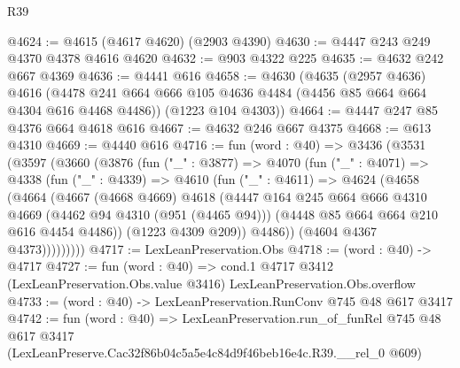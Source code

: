 \begin{lexlean}{R39}
\begin{coremodule}
@4624 := @4615 (@4617 @4620) (@2903 @4390)
@4630 := @4447 @243 @249 @4370 @4378 @4616 @4620
@4632 := @903 @4322 @225
@4635 := @4632 @242 @667 @4369
@4636 := @4441 @616
@4658 := @4630
    (@4635
      (@2957 @4636)
      @4616
      (@4478 @241 @664 @666 @105 @4636 @4484 (@4456 @85 @664 @664 @4304 @616 @4468 @4486))
      (@1223 @104 @4303))
@4664 := @4447 @247 @85 @4376 @664 @4618 @616
@4667 := @4632 @246 @667 @4375
@4668 := @613 @4310
@4669 := @4440 @616
@4716 := fun (word : @40) =>
  @3436
    (@3531
      (@3597
        (@3660
          (@3876
            (fun ("_" : @3877) =>
            @4070
              (fun ("_" : @4071) =>
              @4338
                (fun ("_" : @4339) =>
                @4610
                  (fun ("_" : @4611) =>
                  @4624
                    (@4658
                      (@4664
                        (@4667
                          (@4668 @4669)
                          @4618
                          (@4447
                            @164
                            @245
                            @664
                            @666
                            @4310
                            @4669
                            (@4462 @94 @4310 (@951 (@4465 @94)))
                            (@4448 @85 @664 @664 @210 @616 @4454 @4486))
                          (@1223 @4309 @209))
                        @4486))
                    (@4604 @4367 @4373)))))))))
@4717 := LexLeanPreservation.Obs
@4718 := (word : @40) -> @4717
@4727 := fun (word : @40) =>
  cond.{1} @4717 @3412 (LexLeanPreservation.Obs.value @3416) LexLeanPreservation.Obs.overflow
@4733 := (word : @40) -> LexLeanPreservation.RunConv @745 @48 @617 @3417
@4742 := fun (word : @40) =>
  LexLeanPreservation.run_of_funRel
    @745
    @48
    @617
    @3417
    (LexLeanPreserve.Cac32f86b04c5a5e4c84d9f46beb16e4c.R39.__rel_0 @609)
\end{coremodule}
\end{lexlean}
